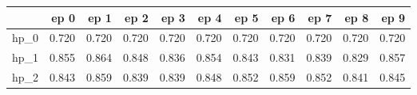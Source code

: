 \begin{tabular}{lrrrrrrrrrr}
\toprule
{} &   ep 0 &   ep 1 &   ep 2 &   ep 3 &   ep 4 &   ep 5 &   ep 6 &   ep 7 &   ep 8 &   ep 9 \\
\midrule
hp\_0 &  0.720 &  0.720 &  0.720 &  0.720 &  0.720 &  0.720 &  0.720 &  0.720 &  0.720 &  0.720 \\
hp\_1 &  0.855 &  0.864 &  0.848 &  0.836 &  0.854 &  0.843 &  0.831 &  0.839 &  0.829 &  0.857 \\
hp\_2 &  0.843 &  0.859 &  0.839 &  0.839 &  0.848 &  0.852 &  0.859 &  0.852 &  0.841 &  0.845 \\
\bottomrule
\end{tabular}
